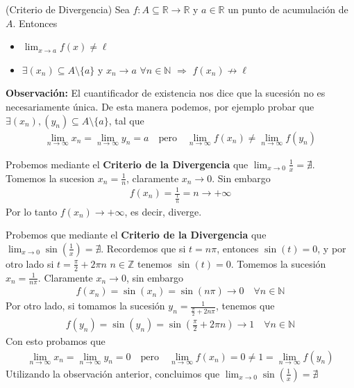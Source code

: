 \documentclass[12pt]{book}
\begin{document}
\begin{teo}{(Criterio de Divergencia)}{}
     Sea $f : A \subseteq  \mathbb{R} \longrightarrow \mathbb{R}$ y $a \in \mathbb{R}$ un punto de acumulación de $A$. Entonces 
     \begin{itemize}
         \item  $\displaystyle \lim_{x \to a} f(x)\neq \ell$
         \item $ \exists  (x_n) \subseteq A\setminus \{a\}$ y $x_n \to a $ $\forall n  \in \mathbb{N}$ $\Longrightarrow$ $f(x_n) \not\to \ell$
     \end{itemize}
\end{teo}
\textbf{Observación:} El cuantificador de existencia nos dice que la sucesión no es necesariamente única. De esta manera podemos, por ejemplo probar que $\exists(x_n), (y_n) \subseteq A\setminus \{a\}$, tal que 
\begin{align*}
    \lim_{n\to\infty}x_n=\lim_{n \to \infty}y_n=a \quad \text{pero} \quad \lim_{n \to \infty}f(x_n)\neq \lim_{n \to \infty}f(y_n)
\end{align*}
\begin{eje}{}{}
    Probemos mediante el \textbf{Criterio de la Divergencia} que $\displaystyle \lim_{x\to 0}\frac{1}{x}=\nexists$. Tomemos la sucesion $\displaystyle x_n= \frac{1}{n}$, claramente $x_n \to 0$. Sin embargo
    \begin{align*}
        f(x_n)=\frac{1}{\frac{1}{n}}=n \to +\infty
    \end{align*}
    Por lo tanto $f(x_n) \to +\infty$, es decir, diverge.
\end{eje}

\begin{eje}{}{}
    Probemos que mediante el \textbf{Criterio de la Divergencia} que $\displaystyle \lim_{x\to 0}\sin\left(\frac{1}{x} \right)=\nexists$. Recordemos que si $t=n\pi$, entonces $\sin(t)=0$, y por otro lado si $t= \frac{\pi}{2}+2\pi n$ $ n \in \mathbb{Z}$ tenemos $\sin(t)=0$. Tomemos la sucesión $x_n=\frac{1}{n \pi}$. Claramente $x_n \to 0$, sin embargo
    \begin{align*}
        f(x_n)=\sin(x_n)=\sin(n\pi)\to 0 \quad \forall n \in \mathbb{N}
    \end{align*}
    Por otro lado, si tomamos la sucesión $y_n=\frac{1}{\frac{\pi}{2}+2n\pi}$, tenemos que
    \begin{align*}
        f(y_n)=\sin(y_n)=\sin\left(\frac{\pi}{2}+2\pi n\right)\to1 \quad \forall n \in \mathbb{N
        }
    \end{align*}
    Con esto probamos que 
    \begin{align*}
        \lim_{n\to\infty}x_n=\lim_{n \to \infty}y_n=0 \quad \text{pero} \quad \lim_{n \to \infty}f(x_n)=0\neq 1=\lim_{n \to \infty}f(y_n)
    \end{align*}
    Utilizando la observación anterior, concluimos que  $\displaystyle \lim_{x\to 0}\sin\left(\frac{1}{x} \right)=\nexists$
\end{eje}
\end{document}
